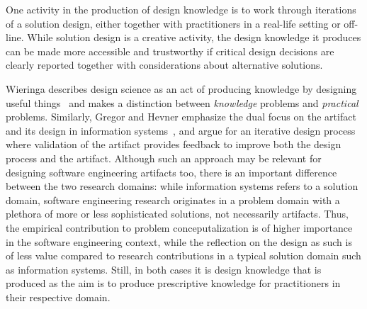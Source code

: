 \documentclass[graybox]{svmult}
\begin{document}

One activity in the production of design knowledge is to work through iterations of a solution design, either together with practitioners in a real-life setting or off-line. %
While solution design is a creative activity, the design knowledge it produces can be made more accessible and trustworthy if critical design decisions are clearly reported together with considerations about alternative solutions.





Wieringa describes design science as an act of producing knowledge by designing useful things~\cite{wieringa_design_2009} and makes a distinction between \emph{knowledge} problems and \emph{practical} problems. Similarly, Gregor and Hevner emphasize the dual focus on the artifact and its design in information systems~\cite{gregor_positioning_2013}, and argue for an iterative design process where validation of the artifact provides feedback  to improve both the design process and the artifact. Although such an approach may be relevant for designing software engineering artifacts too, there is an important difference between the two research domains: while information systems refers to a solution domain, software engineering research originates in a problem domain with a plethora of more or less sophisticated solutions, not necessarily artifacts. Thus, the empirical contribution to problem conceputalization is of higher importance in the software engineering context, while the reflection on the design as such is of less value compared to research contributions in a typical solution domain such as information systems. Still, in both cases it is design knowledge that is produced as the aim is to produce prescriptive knowledge for practitioners in their respective domain. 

 
\end{document}
